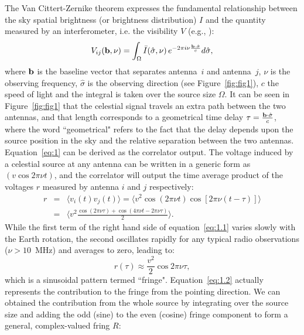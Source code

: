 The Van Cittert-Zernike theorem expresses the fundamental relationship between the sky spatial brightness (or brightness distribution) $I$ and the quantity measured by an interferometer, i.e. the visibility $V$ (e.g., \cite{TMS}):
\begin{equation}
V_{ij} ({\bf b}, \nu) = \int_\Omega {\bar I} (\hat{\bf \sigma}, \nu) \, e^{-2 \pi i \nu \frac{{\bf b} \cdot {\hat {\bf \sigma}}}{c}} d \hat{\bf \sigma},
\label{eq:1}
\end{equation}
where ${\bf b}$ is the baseline vector that separates antenna~$i$ and antenna~$j$, $\nu$ is the observing frequency, $\hat{\sigma}$ is the observing direction (see Figure~\ref{fig:fig1}), $c$ the speed of light and the integral is taken over the source size $\Omega$. 
It can be seen in Figure~\ref{fig:fig1} that the celestial signal travels an extra path between the two antennas, and that length corresponds to a geometrical time delay $\tau = \frac{{\bf b} \cdot {\hat {\bf \sigma}}}{c}$, where the word ``geometrical" refers to the fact that the delay depends upon the source position in the sky and the relative separation between the two antennas. Equation~\ref{eq:1} can be derived as the correlator output. The voltage induced by a celestial source at any antenna can be written in a generic form as $(v \cos{2\pi \nu t})$, and the correlator will output the time average product of the voltages $r$ measured by antenna $i$ and $j$ respectively:
\begin{eqnarray}
r & = & \langle v_i(t)v_j(t) \rangle = \langle v^2 \cos{(2\pi \nu t)} \cos{[2\pi \nu (t - \tau)]} \rangle \nonumber \\
			     & = & \langle v^2 \frac{\cos{(2\pi \nu \tau)} + \cos{(4\pi \nu t - 2\pi \nu \tau)}}{2} \rangle. 	
\label{eq:1.1}
\end{eqnarray}
While the first term of the right hand side of equation~\ref{eq:1.1} varies slowly with the Earth rotation, the second oscillates rapidly for any typical radio observations ($\nu > 10$~MHz) and averages to zero, leading to:  
\begin{equation}
r(\tau) \approx \frac{v^2}{2} \cos{2\pi \nu \tau},
\label{eq:1.2}
\end{equation}
which is a sinusoidal pattern termed ``fringe".
Equation~\ref{eq:1.2} actually represents the contribution to the fringe from the pointing direction. We can obtained the contribution from the whole source by integrating over the source size and adding the odd (sine) to the even (cosine) fringe component to form a general, complex-valued fring $R$: 
